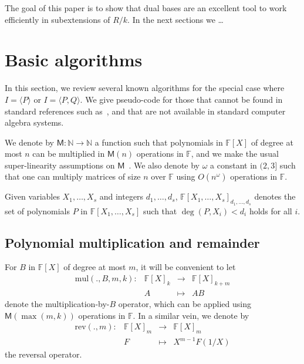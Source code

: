 \documentclass[12pt]{article}
\def\M {\ensuremath{\mathsf{M}}}
\def\N {\ensuremath{\mathbb{N}}}
\def\F {\ensuremath{\mathbb{F}}}
\def\mul {\ensuremath{\mathrm{mul}}}
\def\rev {\ensuremath{\mathrm{rev}}}
\begin{document}
The goal of this paper is to show that dual bases are an excellent
tool to work efficiently in subextensions of $R/k$. In the next
sections we \dots %


\section{Basic algorithms}

In this section, we review several known algorithms for the special
case where $I=\langle P\rangle$ or $I=\langle P,Q\rangle$. We give
pseudo-code for those that cannot be found in standard references such
as~\cite{vzGG}, and that are not available in standard computer
algebra systems.

We denote by $\M:\N \to \N$ a function such that polynomials in
$\F[X]$ of degree at most $n$ can be multiplied in $\M(n)$ operations
in $\F$, and we make the usual super-linearity assumptions on
$\M$~\cite[Chapter~8]{vzGG}. We also denote by $\omega$ a constant in
$(2,3]$ such that one can multiply matrices of size $n$ over $\F$
using $O(n^\omega)$ operations in $\F$.

Given variables $X_1,\dots,X_s$ and integers $d_1,\dots,d_s$,
$\F[X_1,\dots,X_s]_{d_1,\dots,d_s}$ denotes the set of polynomials $P$
in $\F[X_1,\dots,X_s]$ such that $\deg(P,X_i) < d_i$ holds for all
$i$.


\subsection{Polynomial multiplication and remainder}

For $B$ in $\F[X]$ of degree at most $m$, it will be convenient to let
$$
\begin{array}{cccc}
\mul(.,B,m,k): &\F[X]_k& \to &\F[X]_{k+m}\\
& A & \mapsto & AB
\end{array}$$ 
denote the multiplication-by-$B$ operator, which can be applied using
$\M(\max(m,k))$ operations in $\F$. In a similar vein, we denote by
$$
\begin{array}{cccc}
\rev(.,m): &\F[X]_m &\to& \F[X]_m  \\
& F & \mapsto & X^{m-1} F(1/X)
\end{array}$$ the reversal operator. 
\end{document}
